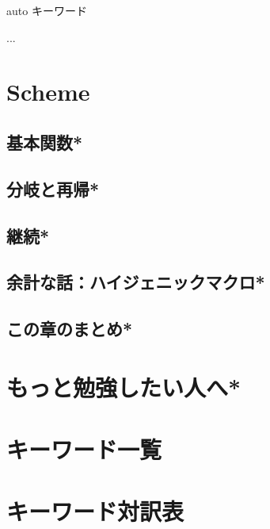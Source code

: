 \documentclass[a4paper,twocolumn]{jsbook}
\newcommand{\programminglanguage}[1]{\textsf{#1}}
\newcommand{\cxx}{\programminglanguage{C}\texttt{++}}
\newcommand{\scheme}{\programminglanguage{Scheme}}
\newenvironment{note}[1]{\begin{boxnote}\begin{center}#1\end{center}}{\end{boxnote}}
\begin{document}
\begin{note}{auto キーワード}
...
\end{note}


\chapter{\scheme}

\section{基本関数*}
\section{分岐と再帰*}
\section{継続*}
\section{余計な話：ハイジェニックマクロ*}
\section{この章のまとめ*}

\chapter{もっと勉強したい人へ*}

\chapter*{キーワード一覧}

\chapter*{キーワード対訳表}

\end{document}
